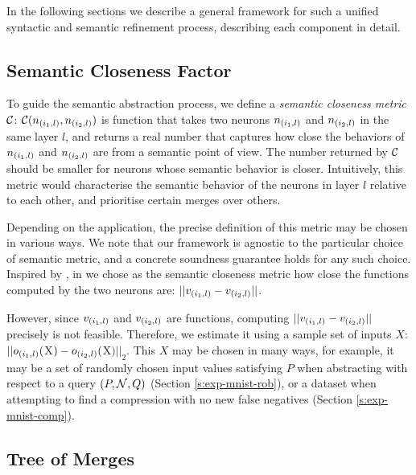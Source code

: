 In the following sections we describe a general framework for such a unified
syntactic and semantic refinement process, describing each component in detail.


\subsection{Semantic Closeness Factor}


To guide the semantic abstraction process, we define a \textit{semantic
closeness metric} $\mathcal{C}$: $\mathcal{C}(n_{(i_1,l)}, n_{(i_2,l)})$ is function that
takes two neurons $n_{(i_1,l)}$ and $n_{(i_2,l)}$ in
the same layer $l$, and returns a real number that
captures how close the behaviors of $n_{(i_1,l)}$ and $n_{(i_2,l)}$ are from a
semantic point of view. The number returned by $\mathcal{C}$ should be smaller for
neurons whose semantic behavior is closer. Intuitively, this metric would
characterise the semantic behavior of the
neurons in layer $l$ relative to each other, and prioritise certain merges over
others. 

Depending on the application, the precise definition of this metric may be
chosen in various ways. We note that our framework is agnostic to the particular
choice of semantic metric, and a concrete soundness guarantee holds for any such
choice. Inspired by \cite{deep-abstract}, in we chose as the
semantic closeness metric how close the functions computed by the two neurons
are: $||v_{(i_1,l)} - v_{(i_2,l)}||$. 

However, since $v_{(i_1,l)}$ and $v_{(i_2,l)}$ are functions, computing
$||v_{(i_1,l)} - v_{(i_2,l)}||$ precisely is not feasible.
Therefore, we estimate it using a sample set of inputs $X$: $||o_{(i_1,l)}($X$)
- o_{(i_2,l)}($X$)||_2$. This $X$ may be chosen in many ways, for example, it
may be a set of randomly chosen input values satisfying $P$ when
abstracting with respect to a query $(P, \mathcal{N}, Q)$
(Section \ref{s:exp-mnist-rob}), or a dataset when attempting to find a
compression with no new false negatives (Section \ref{s:exp-mnist-comp}).

\subsection{Tree of Merges}
\label{s:tree}


